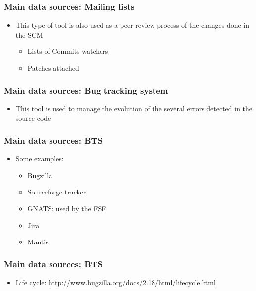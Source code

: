 \documentclass{beamer}
\begin{document}
\begin{frame}
 \frametitle{Main data sources: Mailing lists}
 \begin{itemize}
 \item This type of tool is also used as a peer review process of the changes done in the SCM
   \begin{itemize}
     \item Lists of Commits-watchers
     \item Patches attached 
   \end{itemize}

 \end{itemize}


\end{frame}

\begin{frame}
 \frametitle{Main data sources: Bug tracking system}
 \begin{itemize}
 \item This tool is used to manage the evolution of the several errors detected in the source code


 \end{itemize}


\end{frame}

\begin{frame}
 \frametitle{Main data sources: BTS}
 \begin{itemize}
 \item Some examples:
   \begin{itemize}
    \item Bugzilla
    \item Sourceforge tracker
    \item GNATS: used by the FSF
    \item Jira
    \item Mantis
   \end{itemize} 


 \end{itemize}
\end{frame}

\begin{frame}
 \frametitle{Main data sources: BTS}
 \begin{itemize}
 \item Life cycle: \url{http://www.bugzilla.org/docs/2.18/html/lifecycle.html}

 \end{itemize}

\end{frame}
\end{document}
